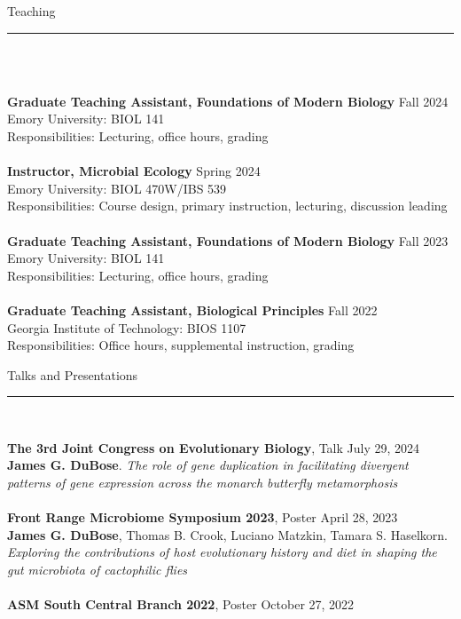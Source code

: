 \documentclass{article}
\begin{document}
\begin{flushleft}
{\Large Teaching} \rule{16.51cm}{0.4pt}\\
\end{flushleft}
\\
\textbf{Graduate Teaching Assistant, Foundations of Modern Biology} \hfill Fall 2024 \\
Emory University: BIOL 141\\
Responsibilities: Lecturing, office hours, grading 
\\
\\
\textbf{Instructor, Microbial Ecology} \hfill Spring 2024 \\
Emory University: BIOL 470W/IBS 539\\
Responsibilities: Course design, primary instruction, lecturing, discussion leading
\\
\\
\textbf{Graduate Teaching Assistant, Foundations of Modern Biology} \hfill Fall 2023 \\
Emory University: BIOL 141\\
Responsibilities: Lecturing, office hours, grading 
\\
\\
\textbf{Graduate Teaching Assistant, Biological Principles} \hfill Fall 2022\\
Georgia Institute of Technology: BIOS 1107 \\
Responsibilities: Office hours, supplemental instruction, grading
\\
\begin{flushleft}
{\Large Talks and Presentations} \rule{16.51cm}{0.4pt}\\
\end{flushleft}
\textbf{The 3rd Joint Congress on Evolutionary Biology}, Talk \hfill July 29, 2024\\
\textbf{James G. DuBose}. \emph{The role of gene duplication in facilitating divergent patterns of gene expression across the monarch butterfly metamorphosis}\\
\\
\textbf{Front Range Microbiome Symposium 2023}, Poster \hfill April 28, 2023\\
\textbf{James G. DuBose}, Thomas B. Crook, Luciano Matzkin, Tamara S. Haselkorn. \emph{Exploring the contributions of host evolutionary history and diet in shaping the gut microbiota of cactophilic flies}\\
\\
\textbf{ASM South Central Branch 2022}, Poster \hfill October 27, 2022\\
\end{document}
